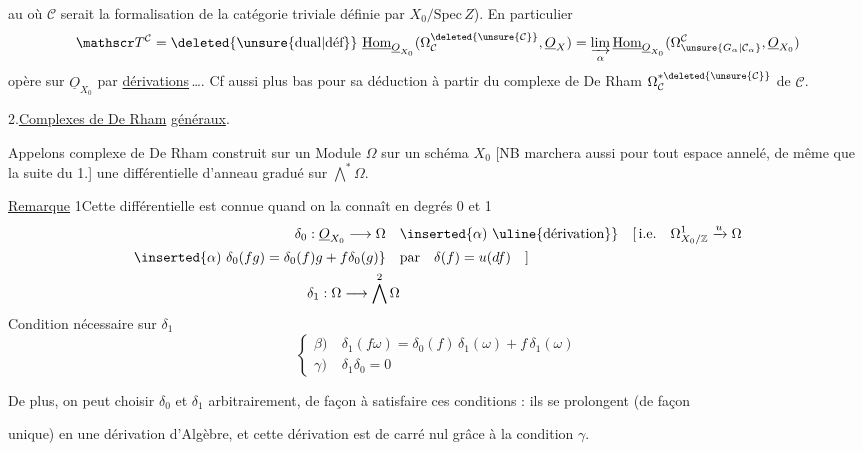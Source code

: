 
au  où $\mathcal C$ serait la formalisation de la catégorie triviale définie par $X_0/\mathrm{Spec}\,Z$). En particulier
\[
\mathscr T^{\mathcal C}=\deleted{\unsure{\mathrm{dual}|\text{déf}}}\ \underline{\mathrm{Hom}}_{\underline O_{X_0}}(\Omega_{\mathcal C}^{\deleted{\unsure{\mathcal C}}},\underline O_X)=\varinjlim_{\alpha}\underline{\mathrm{Hom}}_{\underline O_{X_0}}(\Omega_{\unsure{G_\alpha|\mathcal C_\alpha}}^{\mathcal C},\underline O_{X_0})
\]
opère sur $\underline O_{X_0}$ par \uline{dérivations}\,\ldots. Cf aussi plus bas pour sa déduction à partir du complexe de De Rham $\Omega_{\mathcal C}^{*\deleted{\unsure{\mathcal C}}}$ de $\mathcal C$.

2.\quad \uline{Complexes de De Rham} \uline{généraux}.

Appelons complexe de De Rham construit sur un  Module  $\Omega$ sur un schéma $X_0$ [NB marchera aussi pour tout espace annelé, de même que la suite du 1.]  une  différentielle d'anneau gradué sur $\bigwedge^{*}\Omega$.

\uline{Remarque} 1\quad Cette différentielle est connue quand on la connaît en degrés 0 et 1
\[
\begin{aligned}
\delta_0:\underline O_{X_0}\longrightarrow\Omega\quad &\inserted{\alpha)\ \text{\uline{dérivation}}}\quad [\,\text{i.e.}\quad\Omega^1_{X_0/\mathbb Z}\xrightarrow{u}\Omega\\
\inserted{\alpha)\ \delta_0(fg)=\delta_0(f)g+f\delta_0(g)}\quad &\text{par}\quad\delta(f)=u(df)\quad ]\\
\delta_1:\Omega\longrightarrow\bigwedge^2\Omega &
\end{aligned}
\]
Condition nécessaire sur $\delta_1$
\[
\left\{\begin{aligned}
\beta)\ &\delta_1(f\omega)=\delta_0(f)\,\delta_1(\omega)+f\,\delta_1(\omega)\\
\gamma)\ &\delta_1\delta_0=0
\end{aligned}\right.
\]

De plus, on peut choisir $\delta_0$ et $\delta_1$ arbitrairement, de façon à satisfaire ces conditions : ils se prolongent (de façon


unique) en une dérivation d'Algèbre, et cette dérivation est de carré nul grâce à la condition $\gamma$.

